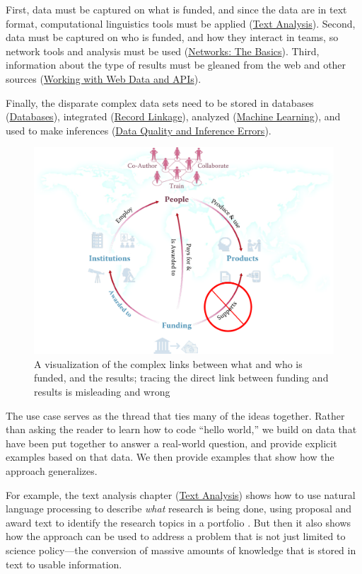 \documentclass[]{krantz}
\begin{document}
First, data must be captured on what is funded, and since the data are
in text format, computational linguistics tools must be applied
(\protect\hyperlink{chap:text}{Text Analysis}). Second, data must be
captured on who is funded, and how they interact in teams, so network
tools and analysis must be used
(\protect\hyperlink{chap:networks}{Networks: The Basics}). Third,
information about the type of results must be gleaned from the web and
other sources (\protect\hyperlink{chap:web}{Working with Web Data and
APIs}).

Finally, the disparate complex data sets need to be stored in databases
(\protect\hyperlink{chap:db}{Databases}), integrated
(\protect\hyperlink{chap:link}{Record Linkage}), analyzed
(\protect\hyperlink{chap:ml}{Machine Learning}), and used to make
inferences (\protect\hyperlink{chap:errors}{Data Quality and Inference
Errors}).

\begin{figure}

{\centering \includegraphics[width=0.7\linewidth]{ChapterIntro/figures/figure_cameron} 

}

\caption{A visualization of the complex links between what and who is funded, and the results; tracing the direct link between funding and results is misleading and wrong}\label{fig:fig2}
\end{figure}

The use case serves as the thread that ties many of the ideas together.
Rather than asking the reader to learn how to code ``hello world,'' we
build on data that have been put together to answer a real-world
question, and provide explicit examples based on that data. We then
provide examples that show how the approach generalizes.

For example, the text analysis chapter
(\protect\hyperlink{chap:text}{Text Analysis}) shows how to use natural
language processing to describe \emph{what} research is being done,
using proposal and award text to identify the research topics in a
portfolio \citep{talley2011database, Evans2011}. But then it also shows
how the approach can be used to address a problem that is not just
limited to science policy---the conversion of massive amounts of
knowledge that is stored in text to usable information.
\end{document}
